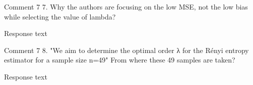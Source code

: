 \documentclass[11pt]{report}
\begin{document}
\vspace{2em}
\begin{reviewbox}{Comment 7}
7. Why the authors are focusing on the low MSE, not the low bias while selecting the value of lambda?
\end{reviewbox}

\begin{responsebox}{Response}
text
\end{responsebox}


\vspace{2em}
\begin{reviewbox}{Comment 7}
8. "We aim to determine the optimal order λ for the Rényi entropy estimator for a sample size n=49" From where these 49 samples are taken?
\end{reviewbox}

\begin{responsebox}{Response}
text
\end{responsebox}
\end{document}
